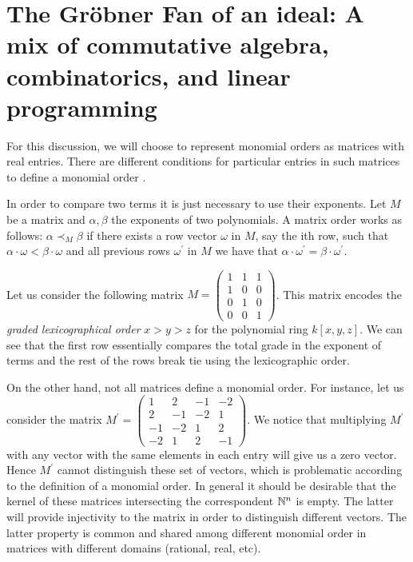 \section{The Gr\"obner Fan of an ideal: A mix of commutative algebra,
  combinatorics, and linear programming}

For this discussion, we will choose to represent monomial orders as matrices with
real entries. There are different conditions for particular entries in such matrices
to define a monomial order \cite{Cox:2014}.

In order to compare two terms it is just necessary to use their exponents. Let $M$
be a matrix and $\alpha, \beta$ the exponents of two polynomials.
A matrix order works as follows: $\alpha \prec_M \beta$
if there exists a row vector $\omega$ in $M$, say the ith row, such that
$\alpha \cdot \omega < \beta \cdot \omega$ and all previous rows $\omega^{'}$ in $M$
we have that $\alpha \cdot \omega^{'} = \beta \cdot \omega^{'}$.

\begin{example} Let us consider the following matrix
  $M = \begin{pmatrix} 1 & 1 & 1 \\
    1 & 0 & 0 \\
    0 & 1 & 0 \\
    0 & 0 & 1 \end{pmatrix}$. This matrix encodes the \emph{graded lexicographical
    order} $x > y > z$ for the polynomial ring $k[x, y, z]$. We can see that the first row
  essentially compares the total grade in the exponent of terms and the rest
  of the rows break tie using the lexicographic order.
\end{example}

\begin{example}
  On the other hand, not all matrices define a monomial order. For instance, let
  us consider the matrix $M^{'} = \begin{pmatrix} 1 & 2 & -1 & -2 \\
    2 & -1 & -2 & 1 \\
    -1 & -2 & 1 & 2 \\
    -2 & 1 & 2 & -1
  \end{pmatrix}$. We notice that multiplying $M^{'}$ with any vector with the same elements in each
  entry will give us a zero vector. Hence $M^{'}$ cannot distinguish
  these set of vectors, which is problematic according to the definition
  of a monomial order. In general it should be desirable that the kernel
  of these matrices intersecting the correspondent $\mathbb{N}^n$ is empty.
  The latter will provide injectivity to the matrix in order to distinguish
  different vectors. The latter property is common and shared among different
  monomial order in matrices with different domains (rational, real, etc).
\end{example}

